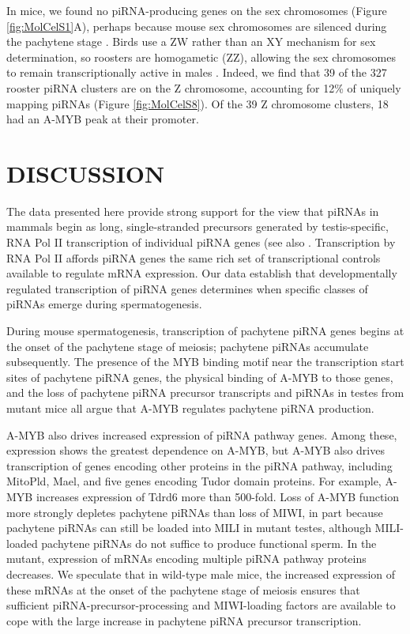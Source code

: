     In mice, we found no piRNA-producing genes on the sex chromosomes (Figure \ref{fig:MolCelS1}A), perhaps because mouse sex chromosomes are silenced during the pachytene stage \citep{Li2009d}. Birds use a ZW rather than an XY mechanism for sex determination, so roosters are homogametic (ZZ), allowing the sex chromosomes to remain transcriptionally active in males \citep{Namekawa2009, Schoenmakers2009}. Indeed, we find that 39 of the 327 rooster piRNA clusters are on the Z chromosome, accounting for 12\% of uniquely mapping piRNAs (Figure \ref{fig:MolCelS8}). Of the 39 Z chromosome clusters, 18 had an A-MYB peak at their promoter.

\section{DISCUSSION}

  The data presented here provide strong support for the view that piRNAs in mammals begin as long, single-stranded precursors generated by testis-specific, RNA Pol II transcription of individual piRNA genes (see also \citet{Vourekas2012}. Transcription by RNA Pol II affords piRNA genes the same rich set of transcriptional controls available to regulate mRNA expression. Our data establish that developmentally regulated transcription of piRNA genes determines when specific classes of piRNAs emerge during spermatogenesis.

  During mouse spermatogenesis, transcription of pachytene piRNA genes begins at the onset of the pachytene stage of meiosis; pachytene piRNAs accumulate subsequently. The presence of the MYB binding motif near the transcription start sites of pachytene piRNA genes, the physical binding of A-MYB to those genes, and the loss of pachytene piRNA precursor transcripts and piRNAs in testes from \amyb{} mutant mice all argue that A-MYB regulates pachytene piRNA production.

  A-MYB also drives increased expression of piRNA pathway genes. Among these, \miwi{} expression shows the greatest dependence on A-MYB, but A-MYB also drives transcription of genes encoding other proteins in the piRNA pathway, including MitoPld, Mael, and five genes encoding Tudor domain proteins. For example, A-MYB increases expression of Tdrd6 more than 500-fold. Loss of A-MYB function more strongly depletes pachytene piRNAs than loss of MIWI, in part because pachytene piRNAs can still be loaded into MILI in \miwi{} mutant testes, although MILI-loaded pachytene piRNAs do not suffice to produce functional sperm. In the \amyb{} mutant, expression of mRNAs encoding multiple piRNA pathway proteins decreases. We speculate that in wild-type male mice, the increased expression of these mRNAs at the onset of the pachytene stage of meiosis ensures that sufficient piRNA-precursor-processing and MIWI-loading factors are available to cope with the large increase in pachytene piRNA precursor transcription.

